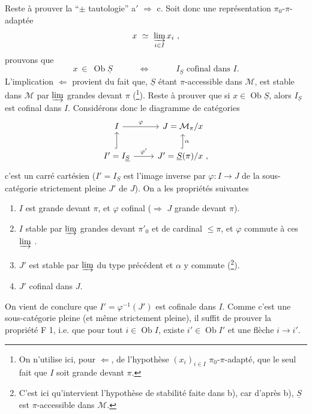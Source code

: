 \documentclass[11pt]{article}
\newcommand{\msp}[1]{\marginpar{\footnotesize [#1]}}
\newcommand{\Ob}{\operatorname{Ob}}
\newcommand{\uS}{\underline{S}}
\begin{document}
Reste à prouver la “$\pm$ tautologie” a$'$ $\Longrightarrow$ c. Soit donc une représentation $\pi_0$-$\pi$-adaptée
\[
x \ \simeq \ \varinjlim_{i\in I} x_i \ ,
\]
prouvons que
\[
x \ \in \ \Ob\uS \qquad\quad \Longleftrightarrow \qquad\quad I_{\uS} \text{ cofinal dans } I.
\]
L'implication $\Longleftarrow$ provient du fait que, $\uS$ étant $\pi$-accessible dans $\mathcal{M}$, est stable dans $\mathcal{M}$ par $\varinjlim$ grandes devant $\pi$ (\footnote[137]{On n'utilise ici, pour $\Longleftarrow$, de l'hypothèse $(x_i)_{i\in I}$ $\pi_0$-$\pi$-adapté, que le seul fait que $I$ soit grande devant $\pi$.}). Reste à prouver\msp{page 312} que si $x \in \Ob\uS$, alors $I_{\uS}$ est cofinal dans $I$. Considérons donc le diagramme de catégories
\[
\begin{tikzcd}
I \arrow[r, "\varphi"] & J = \mathcal{M}_\pi/x \\
I' = I_{\uS} \arrow[u, hook] \arrow[r, "\varphi'"] & J' = \uS(\pi)/x \ , \arrow[u, hook, "\alpha"']
\end{tikzcd}
\]
c'est un carré cartésien ($I' = I_{\uS}$ est l'image inverse par $\varphi : I \longrightarrow J$ de la sous-catégorie strictement pleine $J'$ de $J$). On a les propriétés suivantes
\begin{enumerate}
\item[1)] $I$ est grande devant $\pi$, et $\varphi$ cofinal ($\Longrightarrow$ $J$ grande devant $\pi$).
\item[2)] $I$ stable par $\varinjlim$ grandes devant $\pi'_0$ et de cardinal $\leqslant \pi$, et $\varphi$ commute à ces $\varinjlim$ .
\item[3)] $J'$ est stable par $\varinjlim$ du type précédent et $\alpha$ y commute (\footnote[138]{C'est ici qu'intervient l'hypothèse de stabilité faite dans b), car d'après b), $\uS$ est $\pi$-accessible dans $\mathcal{M}$.}).
\item[4)] $J'$ cofinal dans $J$.
\end{enumerate}
\noindent On vient de conclure que $I' = \varphi^{-1}(J')$\msp{page 313} est cofinale dans $I$. Comme c'est une sous-catégorie pleine (et même strictement pleine), il suffit de prouver la propriété F 1, i.e. que pour tout $i \in \Ob I$, existe $i' \in \Ob I'$ et une flèche $i \longrightarrow i'$.
\end{document}
